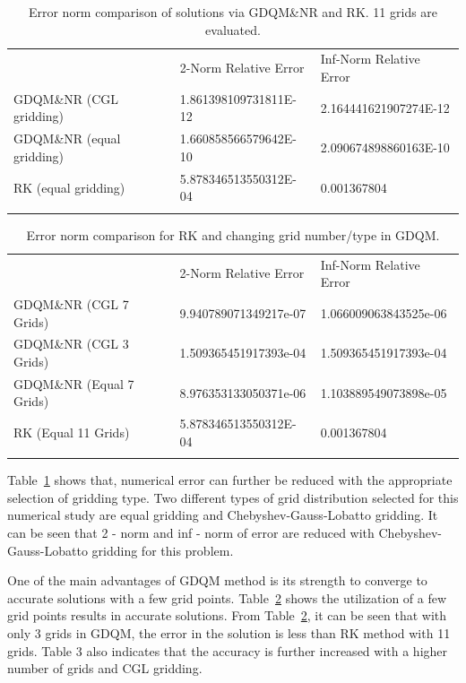 \begin{table}
\caption{Error norm comparison of solutions via  GDQM\&NR and RK. 11 grids are evaluated.}
\label{tab:2}       %
\begin{tabular}{lll}
\hline\noalign{\smallskip}
 &  2-Norm Relative Error & Inf-Norm Relative Error\\
\noalign{\smallskip}\hline\noalign{\smallskip}
GDQM\&NR (CGL gridding) & 1.861398109731811E-12 & 2.164441621907274E-12 \\
GDQM\&NR (equal gridding) & 1.660858566579642E-10 & 2.090674898860163E-10 \\
RK (equal gridding)\cite{EegunjobiEntropy} & 5.878346513550312E-04 & 0.001367804 \\
\noalign{\smallskip}\hline
\end{tabular}
\end{table}

\begin{table}
\caption{Error norm comparison for RK and changing grid number/type in GDQM.}
\label{tab:3}       %
\begin{tabular}{lll}
\hline\noalign{\smallskip}
 &  2-Norm Relative Error & Inf-Norm Relative Error\\
\noalign{\smallskip}\hline\noalign{\smallskip}
GDQM\&NR (CGL 7 Grids) & 9.940789071349217e-07 & 1.066009063843525e-06 \\
GDQM\&NR (CGL 3 Grids) & 1.509365451917393e-04 & 1.509365451917393e-04 \\
GDQM\&NR (Equal 7 Grids) & 8.976353133050371e-06 & 1.103889549073898e-05 \\
RK (Equal 11 Grids) \cite{EegunjobiEntropy} &5.878346513550312E-04 & 0.001367804 \\
\noalign{\smallskip}\hline
\end{tabular}
\end{table}

Table~\ref{tab:2} shows that, numerical error can further be reduced with the appropriate selection of gridding type. Two different types of grid distribution selected for this numerical study are equal gridding and Chebyshev-Gauss-Lobatto gridding. It can be seen that 2 - norm and inf - norm of error are reduced with Chebyshev-Gauss-Lobatto gridding for this problem.

One of the main advantages of GDQM method is its strength to converge to accurate solutions with a few grid points. Table~\ref{tab:3} shows the utilization of a few grid points results in accurate solutions. From Table~\ref{tab:3}, it can be seen that with only 3 grids in GDQM, the error in the solution is less than RK method with 11 grids. Table 3 also indicates that the accuracy is further increased with a higher number of grids and CGL gridding.


